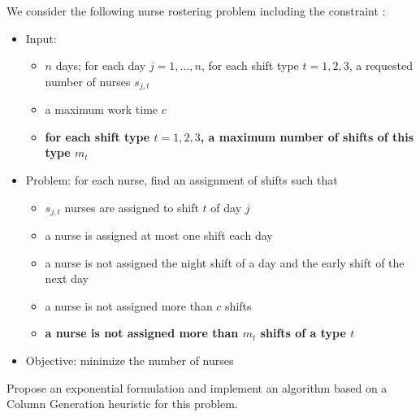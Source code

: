 \documentclass[a4paper,twocolumn]{article}
\begin{document}
We consider the following nurse rostering problem including the constraint :
\begin{itemize}
  \item Input:
    \begin{itemize}
      \item $n$ days; for each day $j = 1, \dots, n$, for each shift type $t = 1, 2, 3$, a requested number of nurses $s_{j, t}$
      \item a maximum work time $c$
      \item \textbf{for each shift type $t = 1, 2, 3$, a maximum number of shifts of this type $m_t$}
    \end{itemize}
  \item Problem: for each nurse, find an assignment of shifts such that
    \begin{itemize}
      \item $s_{j, t}$ nurses are assigned to shift $t$ of day $j$
      \item a nurse is assigned at most one shift each day
      \item a nurse is not assigned the night shift of a day and the early shift of the next day
      \item a nurse is not assigned more than $c$ shifts
      \item \textbf{a nurse is not assigned more than $m_t$ shifts of a type $t$}
    \end{itemize}
  \item Objective: minimize the number of nurses
\end{itemize}


Propose an exponential formulation and implement an algorithm based on a Column Generation heuristic for this problem.
\end{document}

